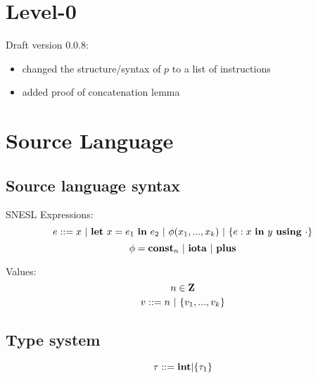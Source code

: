 \def\sfun#1#2{(#1,#2)}

\def\Trans#1#2#3#4#5{#1 \Env #2 \=>{#3}{#4} #5}
\def\Transf#1#2#3#4#5{#1(#2) \=>{#3}{#4} #5}
 
 
\def\S{\mathbf{S}}
\def\Sin{\mathbf{S}_{in}}
\def\Sout{\mathbf{S}_{out}}
\def\FV#1{\mathtt{fv}(#1)}
\def\dv#1{\mathtt{dv}(#1)}


\newcommand{\eq}[2]{\begin{equation}\label{#1} #2\end{equation}}

\providecommand{\versionnumber}{0.0.8}


\section{Level-0}

Draft version \versionnumber: 
\begin{itemize}
	\item changed the structure/syntax of $p$ to a list of instructions
	\item added proof of concatenation lemma
\end{itemize}

\section{Source Language}

\subsection{Source language syntax}
SNESL Expressions:
$$e ::= x \ | \ \Let{x}{e_1}{e_2} \ | \ \hcall{\Tupk{x}} \ | \ \Comp{e}{x}{y}{\cdot} $$
$$\phi = \mathbf{const}_n \ | \ \mathbf{iota} \ | \ \mathbf{plus} $$ 

Values: \\
$$ n \in \mathbf{Z} $$
$$ v::= n \ | \ \{ v_1,...,v_k \}$$

\subsection{Type system}
$$\tau ::= \mathbf{int} | \{\tau_1\}$$

